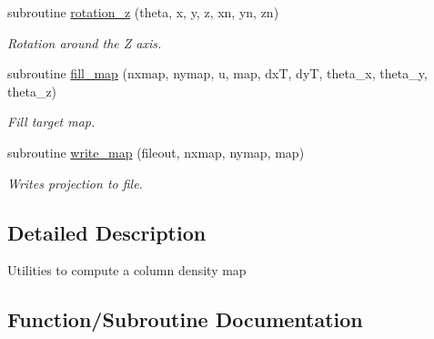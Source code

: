 \begin{DoxyCompactItemize}
subroutine \hyperlink{namespacecoldens__utilities_a062761acebb4d5a76b3706256a491687}{rotation\+\_\+z} (theta, x, y, z, xn, yn, zn)
\begin{DoxyCompactList}\small\item\em Rotation around the Z axis. \end{DoxyCompactList}\item 
subroutine \hyperlink{namespacecoldens__utilities_af035b829538114f8b62f54365269bdab}{fill\+\_\+map} (nxmap, nymap, u, map, dx\+T, dy\+T, theta\+\_\+x, theta\+\_\+y, theta\+\_\+z)
\begin{DoxyCompactList}\small\item\em Fill target map. \end{DoxyCompactList}\item 
subroutine \hyperlink{namespacecoldens__utilities_a78891c0c5736f8d50bf07d19757e7237}{write\+\_\+map} (fileout, nxmap, nymap, map)
\begin{DoxyCompactList}\small\item\em Writes projection to file. \end{DoxyCompactList}\end{DoxyCompactItemize}


\subsection{Detailed Description}
Utilities to compute a column density map 

\subsection{Function/\+Subroutine Documentation}
\hypertarget{namespacecoldens__utilities_af035b829538114f8b62f54365269bdab}{}
